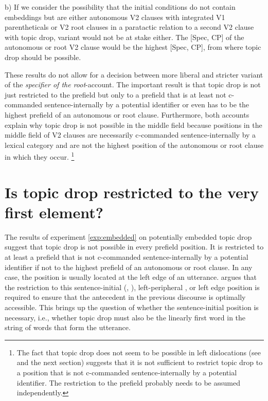 b) If we consider the possibility that the initial conditions do not contain embeddings but are either autonomous V2 clauses with integrated V1 parentheticals or V2 root clauses in a paratactic relation to a second V2 clause with topic drop,  variant would not be at stake either.
The [Spec, CP] of the autonomous or root V2 clause would be the highest [Spec, CP], from where topic drop should be possible.

These results do not allow for a decision between  more liberal and  stricter variant of the \textit{specifier of the root}-account.
The important result is that topic drop is not just restricted to the prefield but only to a prefield that is at least not c-commanded  sentence-internally by a potential identifier or even  has to be the highest prefield of an autonomous or root clause.
Furthermore, both accounts explain why topic drop is not possible in the middle field  because positions in the middle field of V2 clauses are necessarily c‑commanded sentence‑internally by a lexical category and are not the highest position of the autonomous or root clause in which they occur.%
\footnote{The fact that topic drop does not seem to be possible in left dislocations  (see \cite{volodina.onea2012} and the next section) suggests that it is not sufficient to restrict topic drop to a position that is not c-commanded sentence‑internally by a potential identifier.
The restriction to the prefield probably needs to be assumed independently.}  

\section{Is topic drop restricted to the very first element?}\label{sec:initial}
The results of experiment \ref*{exp:embedded} on potentially embedded topic drop suggest that topic drop is not possible in every prefield position.
It is restricted to at least a prefield that is not c-commanded  sentence-internally by a potential identifier if not to the highest prefield of an autonomous or root clause.
In any case, the position is usually located at the left edge of an utterance.
\citet{trutkowski2016} argues that the restriction to this sentence-initial (\cite[547]{huang1984}, \cite[1]{trutkowski2016}), left-peripheral \citep[150]{freywald2020}, or left edge \citep[99]{ackema.neeleman2007} position is required to ensure that the antecedent  in the previous discourse is optimally accessible.
This brings up the question of whether the sentence-initial position is necessary, i.e., whether topic drop must also be the linearly first word in the string of words that form the utterance.

